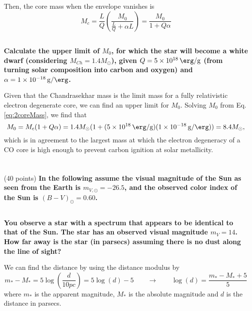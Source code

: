Then, the core mass when the envelope vanishes is
\begin{equation}
    M_c = \frac{L}{Q}\left(\frac{M_0}{\frac{L}{Q} +\alpha L}\right) = \frac{M_0}{1+Q\alpha}
    \label{eq:2coreMass}
\end{equation}


\subsection{}
\textbf{Calculate the upper limit of $M_0$, for which the star will become a white dwarf (considering $M_{Ch} = 1.4M_\odot$), given $Q = \SI{5e18}{\erg\per\g}$ (from turning solar composition
into carbon and oxygen) and $\alpha = \SI{1e-18}{g\per\erg}$.}

Given that the Chandrasekhar mass is the limit mass for a fully relativistic electron degenerate core, we can find an upper limit for $M_0$. Solving $M_0$ from Eq. \ref{eq:2coreMass}, we find that
\begin{equation*}
    M_0 = M_c (1+Q\alpha) = 1.4M_\odot (1 + (\SI{5e18}{\erg\per\g})(\SI{1e-18}{g\per\erg}))= 8.4 M_\odot,
\end{equation*}
which is in agreement to the largest mass at which the electron degeneracy of a CO core is high enough to prevent carbon ignition at solar metallicity.



\newpage
\section{}(40 points)
\textbf{In the following assume the visual magnitude of the Sun as seen from the Earth is $m_{V,\odot} = -26.5$, and the observed color index of the Sun is $(B-V)_\odot = 0.60$.}
\subsection{}
\textbf{You observe a star with a spectrum that appears to be identical to that of the Sun.
The star has an observed visual magnitude $m_V = 14$. How far away is the star (in parsecs) assuming there is no dust along the line of sight?}

We can find the distance by using the distance modulus by
\begin{equation*}
    m_*-M_* = 5\log\left(\frac{d}{10pc}\right)=5\log(d)-5 \qquad\rightarrow\qquad \log(d) = \frac{m_*-M_*+5}{5}
\end{equation*}
where $m_*$ is the apparent magnitude, $M_*$ is the absolute magnitude and $d$ is the distance in parsecs.

